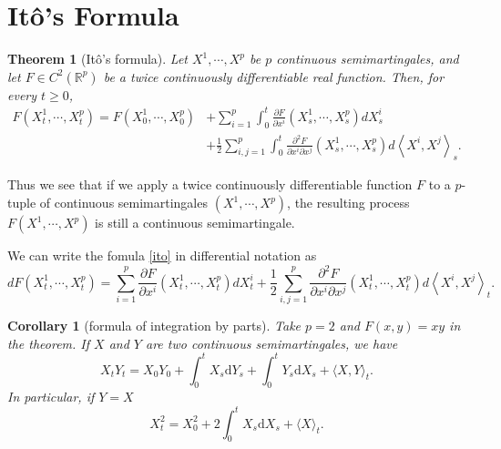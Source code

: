\documentclass{report}
\newtheorem{corollary}{Corollary}[section]
\newtheorem{theorem}{Theorem}[section]
\theoremstyle{nonumberplain}
\begin{document}
\section{Itô's Formula}
\begin{theorem}[Itô's formula]
	Let $X^{1}, \cdots, X^{p}$ be $p$ continuous semimartingales, and let $F\in C^2(\mathbb{R}^{p})$ be a twice continuously differentiable real function. Then, for every $t \geq 0$,
	\begin{align}
		F\left(X_{t}^{1}, \cdots, X_{t}^{p}\right)=F\left(X_{0}^{1}, \cdots, X_{0}^{p}\right) &+\sum_{i=1}^{p} \int_{0}^{t} \frac{\partial F}{\partial x^{i}}\left(X_{s}^{1}, \cdots, X_{s}^{p}\right) d X_{s}^{i} \nonumber\\
		&+\frac{1}{2} \sum_{i, j=1}^{p} \int_{0}^{t} \frac{\partial^{2} F}{\partial x^{i} \partial x^{j}}\left(X_{s}^{1}, \cdots, X_{s}^{p}\right) d\left\langle X^{i}, X^{j}\right\rangle_{s}.\label{ito}
	\end{align}
\end{theorem}
Thus we see that if we apply a twice continuously differentiable function $F$ to a $p$-tuple of continuous semimartingales $(X^{1}, \cdots, X^{p})$, the resulting process $F(X^{1}, \cdots, X^{p})$ is still a continuous semimartingale.

We can write the fomula \ref{ito} in differential notation as
\[
dF\left(X_{t}^{1}, \cdots, X_{t}^{p}\right)=\sum_{i=1}^{p}  \frac{\partial F}{\partial x^{i}}\left(X_{t}^{1}, \cdots, X_{t}^{p}\right) d X_{t}^{i} 
+\frac{1}{2} \sum_{i, j=1}^{p}  \frac{\partial^{2} F}{\partial x^{i} \partial x^{j}}\left(X_{t}^{1}, \cdots, X_{t}^{p}\right) d\left\langle X^{i}, X^{j}\right\rangle_{t}.
\]

\begin{corollary}[formula of integration by parts]
	Take $p=2$ and $F(x, y)=x y$ in the theorem. If $X$ and $Y$ are two continuous semimartingales, we have
	\[
	X_{t} Y_{t}=X_{0} Y_{0}+\int_{0}^{t} X_{s} \mathrm{d} Y_{s}+\int_{0}^{t} Y_{s} \mathrm{d} X_{s}+\langle X, Y\rangle_{t}.
	\]
	In particular, if $Y=X$
	\[
	X_{t}^{2}=X_{0}^{2}+2 \int_{0}^{t} X_{s} \mathrm{d} X_{s}+\langle X\rangle_{t}.
	\]
\end{corollary}
\end{document}
